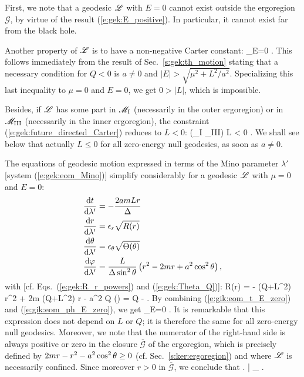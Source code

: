 First, we note that a geodesic $\mathscr{L}$ with $E=0$ cannot exist outside the ergoregion
$\mathscr{G}$, by virtue of the result (\ref{e:gek:E_positive}). In particular,
it cannot exist far from the black hole.

Another property of $\mathscr{L}$ is to have a non-negative Carter constant:
\be \label{e:gik:Q_nonneg_E_zero}
   _{E=0} .
\ee
This follows immediately from the result of Sec.~\ref{s:gek:th_motion}
stating that a necessary condition for $Q < 0$ is $a\neq 0$ and
$|E| > \sqrt{\mu^2 + L^2/a^2}$. Specializing this last inequality to $\mu=0$
and $E=0$, we get $0 > |L|$, which is impossible.

Besides, if $\mathscr{L}$ has some part in $\mathscr{M}_{\rm I}$ (necessarily in the outer ergoregion)
or in $\mathscr{M}_{\rm III}$ (necessarily in the inner ergoregion),
the constraint (\ref{e:gek:future_directed_Carter})
reduces to $L<0$:
\be \label{e:gik:E_zero_L_neg_ergo}
    \Li \cap (\M_{\rm I} \cup \M_{\rm III}) \neq  \varnothing \quad \Longrightarrow \quad L < 0 .
\ee
We shall see below that actually $L \leq 0$ for all zero-energy null geodesics, as soon as $a\neq 0$.

The equations of geodesic motion expressed in terms of the Mino parameter $\lambda'$
[system (\ref{e:gek:eom_Mino})] simplify considerably for a geodesic $\mathscr{L}$ with $\mu=0$ and $E=0$:
\begin{subequations}
\begin{align}
&  \frac{\mathrm{d} t}{\mathrm{d} \lambda'} = - \frac{2 a m L r}{\Delta} \label{e:gik:eom_t_E_zero} \\
&  \frac{\mathrm{d} r}{\mathrm{d} \lambda'} = \epsilon_r \sqrt{ R(r) }  \label{e:gik:eom_r_E_zero}\\
&  \frac{\mathrm{d} \theta}{\mathrm{d} \lambda'} = \epsilon_\theta \sqrt{\Theta(\theta)}  \\
&  \frac{\mathrm{d} \varphi}{\mathrm{d} \lambda'}  = \frac{L}{\Delta\sin^2\theta} \left( r^2 - 2 m r + a^2\cos^2\theta \right) ,
                                \label{e:gik:eom_ph_E_zero}
\end{align}
\end{subequations}
with [cf. Eqs.~(\ref{e:gek:R_r_powers}) and (\ref{e:gek:Theta_Q})]:
\be \label{e:gik:R_E_zero}
    R(r) = - (Q+L^2) r^2 + 2m (Q+L^2) r - a^2 Q
\ee
\be \label{e:gik:Theta_E_zero}
    \Theta(\th) = Q -  .
\ee
By combining (\ref{e:gik:eom_t_E_zero}) and (\ref{e:gik:eom_ph_E_zero}), we get
\be
    _{E=0} .
\ee
It is remarkable that this expression does not depend on $L$ or $Q$; it is therefore the
same for all zero-energy null geodesics. Moreover, we note that the numerator
of the right-hand side is always positive or zero in the closure $\overline{\mathscr{G}}$ of the ergoregion,
which is precisely defined by $2mr - r^2 - a^2\cos^2\theta \geq 0$ (cf. Sec.~\ref{s:ker:ergoregion})
and where $\mathscr{L}$ is necessarily confined. Since moreover $r > 0$ in $\overline{\mathscr{G}}$,
we conclude that
\be
    \left.  \right| _{\Li}  .
\ee


